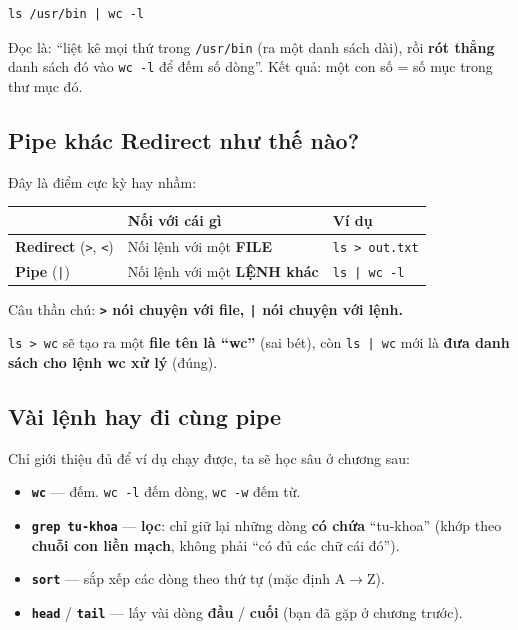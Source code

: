 \documentclass[12pt,a4paper]{article}
\newcommand{\cmd}[1]{\texttt{#1}}
\begin{document}
\begin{Verbatim}
ls /usr/bin | wc -l
\end{Verbatim}

Đọc là: ``liệt kê mọi thứ trong \cmd{/usr/bin} (ra một danh sách dài), rồi \textbf{rót thẳng} danh sách đó vào \cmd{wc -l} để đếm số dòng''. Kết quả: một con số = số mục trong thư mục đó.

\subsection{Pipe khác Redirect như thế nào?}

Đây là điểm cực kỳ hay nhầm:

\begin{center}
\begin{tabular}{>{\raggedright\arraybackslash}p{3.6cm} >{\raggedright\arraybackslash}p{4.6cm} >{\raggedright\arraybackslash}p{3.6cm}}
\rowcolor{seniorbluebg}
& \textbf{Nối với cái gì} & \textbf{Ví dụ} \\
\hline
\textbf{Redirect} (\cmd{>}, \cmd{<}) & Nối lệnh với một \textbf{FILE} & \cmd{ls > out.txt} \\
\textbf{Pipe} (\cmd{|}) & Nối lệnh với một \textbf{LỆNH khác} & \cmd{ls | wc -l} \\
\end{tabular}
\end{center}

Câu thần chú: \textbf{\cmd{>} nói chuyện với file, \cmd{|} nói chuyện với lệnh.}

\cmd{ls > wc} sẽ tạo ra một \textbf{file tên là ``wc''} (sai bét), còn \cmd{ls | wc} mới là \textbf{đưa danh sách cho lệnh wc xử lý} (đúng).

\subsection{Vài lệnh hay đi cùng pipe}

Chỉ giới thiệu đủ để ví dụ chạy được, ta sẽ học sâu ở chương sau:

\begin{itemize}[leftmargin=1.4em]
\item \textbf{\cmd{wc}} --- đếm. \cmd{wc -l} đếm dòng, \cmd{wc -w} đếm từ.
\item \textbf{\cmd{grep tu-khoa}} --- \textbf{lọc}: chỉ giữ lại những dòng \textbf{có chứa} ``tu-khoa'' (khớp theo \textbf{chuỗi con liền mạch}, không phải ``có đủ các chữ cái đó'').
\item \textbf{\cmd{sort}} --- sắp xếp các dòng theo thứ tự (mặc định A$\rightarrow$Z).
\item \textbf{\cmd{head}} / \textbf{\cmd{tail}} --- lấy vài dòng \textbf{đầu} / \textbf{cuối} (bạn đã gặp ở chương trước).
\end{itemize}
\end{document}
